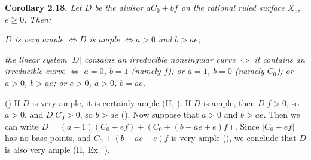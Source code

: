 {\medskip
\noindent\hypertarget{result-V-2.18}{}\textbf{Corollary 2.18.} \emph{Let $D$ be the divisor $aC_0+bf$ on the rational ruled surface $X_e$, $e\ge0$. Then:}
\begin{parts}
\item\hypertarget{result-V-2.18a}{} \emph{$D$ is very ample $\Leftrightarrow D$ is ample $\Leftrightarrow a>0$ and $b>ae$;}
\item\hypertarget{result-V-2.18b}{} \emph{the linear system $|D|$ contains an irreducible nonsingular curve $\Leftrightarrow$ it contains an irreducible curve $\Leftrightarrow$ $a=0$, $b=1$ (namely $f$); or $a=1$, $b=0$ (namely $C_0$); or $a>0$, $b>ae$; or $e>0$, $a>0$, $b=ae$.}
\end{parts}

\Proof\par
() If $D$ is very ample, it is certainly ample (II, ). If $D$ is ample, then $D.f>0$, so $a>0$, and $D.C_0>0$, so $b>ae$ (). Now suppose that $a>0$ and $b>ae$. Then we can write $D=(a-1)(C_0+ef)+(C_0+(b-ae+e)f)$. Since $|C_0+ef|$ has no base points, and $C_0+(b-ae+e)f$ is very ample (), we conclude that $D$ is also very ample (II, Ex.~).
}
